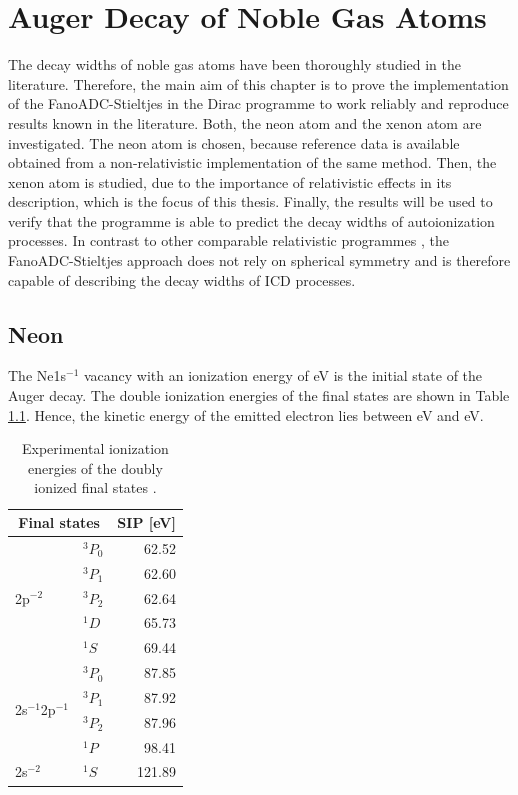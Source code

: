 \chapter{Auger Decay of Noble Gas Atoms}
The decay widths of noble gas atoms have been thoroughly studied in the
literature. Therefore, the main aim of this chapter is to prove the implementation
of the FanoADC-Stieltjes in the Dirac programme \cite{DIRAC13} to work
reliably and reproduce results known in the literature. Both, the neon atom
and the xenon atom are investigated.
The neon atom is chosen, because reference data is available
obtained from a non-relativistic
implementation of the same method. Then, the xenon atom is studied, due
to the importance of relativistic effects in its description, which is
the focus of this thesis.
Finally, the results will be used to verify that the programme is
able to predict the decay widths of autoionization processes.
In contrast to other comparable relativistic programmes
\cite{Tulkki92,Fritzsche12}, the FanoADC-Stieltjes approach does not
rely on spherical symmetry and is therefore capable of describing
the decay widths of \ac{ICD} processes.


\section{Neon}

The Ne1s$^{-1}$ vacancy with an ionization energy of \unit[870]{eV}
\cite{Saethre84} is
the initial state of the Auger decay. The double ionization energies of
the final states are shown in Table \ref{table:Ne_dips}. Hence, the
kinetic energy of the emitted electron lies between
\unit[748]{eV} and \unit[808]{eV}.

\begin{table}[h]
  \centering
  \caption{Experimental ionization energies of the doubly ionized final states
           \cite{NIST2014}.}
  \begin{tabular}{llr}
   \toprule
   \multicolumn{2}{c}{Final states} & \acs{SIP} [eV]\\
   \midrule
   \multirow{5}{*}{2p$^{-2}$} & $^3P_0$        & 62.52 \\
                              & $^3P_1$        & 62.60 \\
                              & $^3P_2$        & 62.64 \\
                              & $^1D$          & 65.73 \\
                              & $^1S$          & 69.44 \\
   \midrule
 \multirow{4}{*}{2s$^{-1}$2p$^{-1}$} & $^3P_0$ & 87.85 \\
                              & $^3P_1$        & 87.92 \\
                              & $^3P_2$        & 87.96 \\
                              & $^1P$          & 98.41 \\
   \midrule                                    
      2s$^{-2}$               & $^1S$          &121.89 \\
   \bottomrule
  \end{tabular}
  \label{table:Ne_dips}
\end{table}

